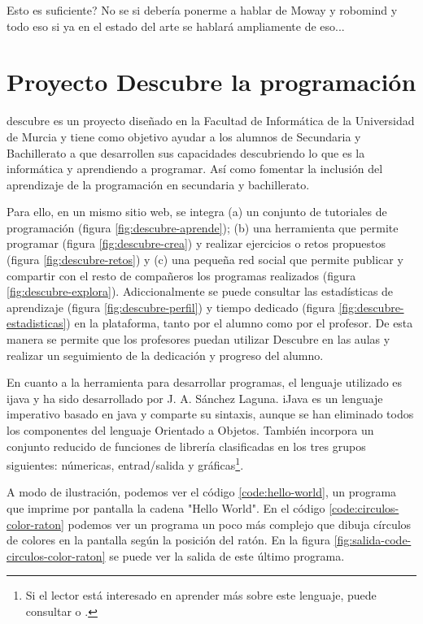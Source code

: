 {\color{red}
Esto es suficiente?
No se si debería ponerme a hablar de Moway y robomind y todo eso si ya en el estado del arte se hablará ampliamente de eso...
}



\section{Proyecto Descubre la programación}
\label{sec:descubre}

\Gls{descubre}\cite{descubre} es un proyecto diseñado en la Facultad de Informática de la Universidad de Murcia y tiene como objetivo ayudar a los alumnos de Secundaria y Bachillerato a que desarrollen sus capacidades descubriendo lo que es la informática y aprendiendo a programar. Así como fomentar la inclusión del aprendizaje de la programación en secundaria y bachillerato.

Para ello, en un mismo sitio web, se integra (a) un conjunto de tutoriales de programación (figura \ref{fig:descubre-aprende}); (b) una herramienta que permite programar (figura \ref{fig:descubre-crea}) y realizar ejercicios o retos propuestos (figura \ref{fig:descubre-retos}) y (c) una pequeña red social que permite publicar y compartir con el resto de compañeros los programas realizados (figura \ref{fig:descubre-explora}). Adiccionalmente se puede consultar las estadísticas de aprendizaje (figura \ref{fig:descubre-perfil}) y tiempo dedicado (figura \ref{fig:descubre-estadisticas}) en la plataforma, tanto por el alumno como por el profesor. De esta manera se permite que los profesores puedan utilizar Descubre en las aulas y realizar un seguimiento de la dedicación y progreso del alumno.

En cuanto a la herramienta para desarrollar programas, el lenguaje utilizado es \gls{ijava}\cite{sanchez2009ijava} y ha sido desarrollado por J. A. Sánchez Laguna. iJava es un lenguaje imperativo basado en \Gls{java} y comparte su sintaxis, aunque se han eliminado todos los componentes del lenguaje Orientado a Objetos. También incorpora un conjunto reducido de funciones de librería clasificadas en los tres grupos siguientes: númericas, entrad/salida y gráficas\footnote{Si el lector está interesado en aprender más sobre este lenguaje, puede consultar \cite{sanchez2009ijava} o \cite{descubre-lenguaje}.}.

A modo de ilustración, podemos ver el código \ref{code:hello-world}, un programa que imprime por pantalla la cadena "Hello World". En el código \ref{code:circulos-color-raton} podemos ver un programa un poco más complejo que dibuja círculos de colores en la pantalla según la posición del ratón. En la figura \ref{fig:salida-code-circulos-color-raton} se puede ver la salida de este último programa.


